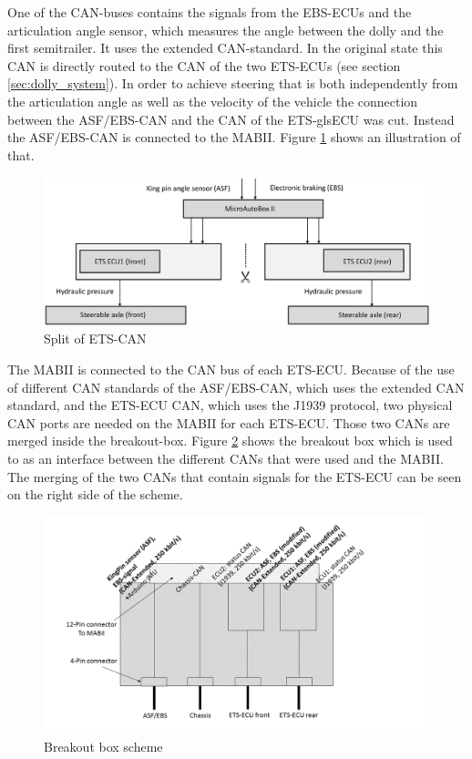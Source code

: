 \documentclass[ExampleMasters.tex]{subfiles}
\begin{document}
One of the \gls{CAN}-buses contains the signals from the EBS-ECUs and the articulation angle sensor, which measures the angle between the dolly and the first semitrailer. It uses the extended CAN-standard. In the original state this \gls{CAN} is directly routed to the \gls{CAN} of the two \gls{ETS}-\gls{ECU}s (see section \ref{sec:dolly_system}). In order to achieve steering that is both independently from the articulation angle as well as the velocity of the vehicle the connection between the \gls{ASF}/\gls{EBS}-\gls{CAN} and the \gls{CAN} of the \gls{ETS}-gls{ECU} was cut. Instead the ASF/EBS-\gls{CAN} is connected to the \gls{MABII}. Figure \ref{fig:dolly_split} shows an illustration of that.\\

\begin{figure}[!htb]
	\centering
	\includegraphics[width=1\linewidth]{figures/dolly_split}
	\caption{Split of \gls{ETS}-\gls{CAN}}
	\label{fig:dolly_split}
\end{figure}  

The \gls{MABII} is connected to the \gls{CAN} bus of each \gls{ETS}-ECU. Because of the use of different \gls{CAN} standards of the ASF/EBS-\gls{CAN}, which uses the extended \gls{CAN} standard, and the \gls{ETS}-ECU CAN, which uses the J1939 protocol, two physical \gls{CAN} ports are needed on the \gls{MABII} for each \gls{ETS}-\gls{ECU}. Those two \gls{CAN}s are merged inside the breakout-box. Figure \ref{fig:BOB} shows the breakout box which is used to as an interface between the different \gls{CAN}s that were used and the \gls{MABII}. The merging of the two \gls{CAN}s that contain signals for the \gls{ETS}-\gls{ECU} can be seen on the right side of the scheme.\\

\begin{figure}[!htb]
	\centering
	\includegraphics[width=1\linewidth]{figures/BOB_schema}
	\caption{Breakout box scheme}
	\label{fig:BOB}
\end{figure}
\end{document}
